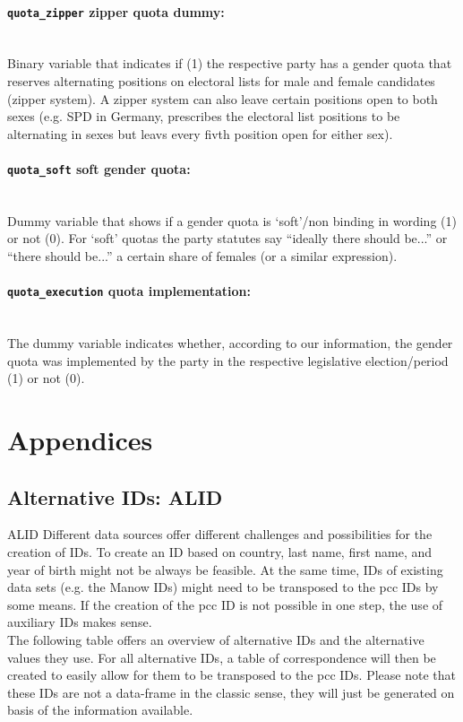 \documentclass{article}
\begin{document}
\paragraph{\texttt{quota\_zipper} zipper quota dummy:}\\ 
Binary variable that indicates if (1) the respective party has a gender quota that reserves alternating positions on electoral lists for male and female candidates (zipper system). A zipper system can also leave certain positions open to both sexes (e.g. SPD in Germany, prescribes the electoral list positions to be alternating in sexes but leavs every fivth position open for either sex).

\paragraph{\texttt{quota\_soft} soft gender quota:}\\ 
Dummy variable that shows if a gender quota is `soft'/non binding in wording (1) or not (0). For `soft' quotas the party statutes say ``ideally there should be...'' or ``there should be...'' a certain share of females (or a similar expression).

\paragraph{\texttt{quota\_execution} quota implementation:}\\ 
The dummy variable indicates whether, according to our information, the gender quota was implemented by the party in the respective legislative election/period (1) or not (0).




\section{Appendices}\label{Appendices}
\subsection{Alternative IDs: ALID}\label{AltIDS} ALID
Different data sources offer different challenges and possibilities for the creation of IDs. To create an ID based on country, last name, first name, and year of birth might not be always be feasible. At the same time, IDs of existing data sets (e.g. the Manow IDs) might need to be transposed to the \gls{pcc} IDs by some means. If the creation of the \gls{pcc} ID is not possible in one step, the use of auxiliary IDs makes sense.
\\ The following table offers an overview of alternative IDs and the alternative values they use. For all alternative IDs, a table of correspondence will then be created to easily allow for them to be transposed to the \gls{pcc} IDs. Please note that these IDs are not a data-frame in the classic sense, they will just be generated on basis of the information available.
\end{document}
